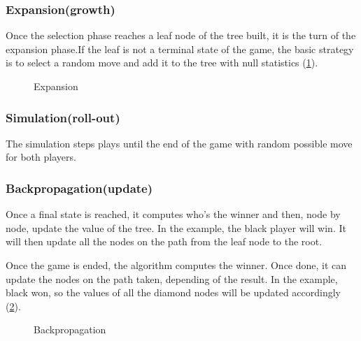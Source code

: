 \subsubsection{Expansion(growth)}
Once the selection phase reaches a leaf node of the tree built, it is the turn of the expansion phase.If the leaf is not a terminal state of the game, the basic strategy is to select a random move and add it to the tree with null statistics (\ref{Exp}).
\begin{figure}
\begin{center}
\end{center}
\caption{Expansion}
\label{Exp}
\end{figure}

\subsubsection{Simulation(roll-out)}
The simulation steps plays until the end of the game with random possible move for both players. 

\subsubsection{Backpropagation(update)}
Once a final state is reached, it computes who's the winner and then, node by node, update the value of the tree. In the example, the black player will win. It will then update all the nodes on the path from the leaf node to the root. 


Once the game is ended, the algorithm computes the winner. Once done, it can update the nodes on the path taken, depending of the result. In the example, black won, so the values of all the diamond nodes will be updated accordingly (\ref{Back}). 
\begin{figure}
\begin{center}
\end{center}
\caption{Backpropagation}
\label{Back}
\end{figure}

